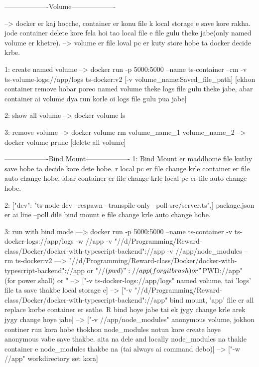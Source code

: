 -------------------Volume-------------------

--> docker er kaj hocche, container er konu file k local storage e save kore rakha. jode container delete kore fela hoi tao local file e file gulu theke jabe(only named volume er khetre).
--> volume er file loval pc er kuty store hobe ta docker decide krbe. 

1: create named volume
--> docker run -p 5000:5000 --name ts-container --rm -v ts-volume-logs://app/logs ts-docker:v2  [-v volume_name:Saved_file_path]
[ekhon container remove hobar poreo named volume theke logs file gulu theke jabe, abar container ai volume dya run korle oi logs file gulu pua jabe]

2: show all volume
--> docker volume ls

3: remove volume
--> docker volume rm volume_name_1 volume_name_2
--> docker volume prune [delete all volume]


-------------------Bind Mount-------------------
1: Bind Mount er maddhome file kuthy save hobe ta decide kore dete hobe. r local pc er file change krle container er file auto change hobe. abar container er file change krle local pc er file auto change hobe.

2: ["dev": "ts-node-dev --respawn --transpile-only --poll src/server.ts",]  package.json er ai line --poll dile bind mount e file change krle auto change hobe.

3: run with bind mode
---> docker run -p 5000:5000 --name ts-container -v ts-docker-logs://app/logs -w //app -v "//d/Programming/Reward-class/Docker/docker-with-typescript-backend"://app -v //app/node_modules --rm ts-docker:v2
---> "//d/Programming/Reward-class/Docker/docker-with-typescript-backend"://app or  "//$(pwd)"://app (for git brash) or "${PWD}://app" (for power shall) or "%
--> ["-v ts-docker-logs://app/logs" named volume, tai 'logs' file ta save thakbe local storage e]
--> ["-v "//d/Programming/Reward-class/Docker/docker-with-typescript-backend"://app" bind mount, 'app' file er all replace korbe container er sathe. R bind hoye jabe tai ek jygy change krle arek jygy change hoye jabe]
--> ["-v //app/node_modules" anonymous volume, jokhon continer run kora hobe thokhon node_modules notun kore create hoye anonymous vabe save thakbe. aita na dele and locally node_modules na thakle container e node_modules thakbe na (tai always ai command debo)]
--> ["-w //app" workdirectory set kora]
